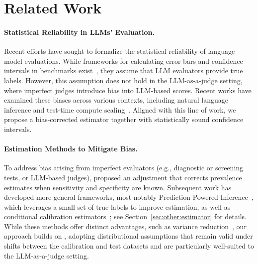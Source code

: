 \section{Related Work}
\label{sec:relatedwork}

\paragraph{Statistical Reliability in LLMs' Evaluation.}
Recent efforts have sought to formalize the statistical reliability of language model evaluations. While frameworks for calculating error bars and confidence intervals in benchmarks exist~\citep{miller2024adding}, they assume that LLM evaluators provide true labels. However, this assumption does not hold in the LLM-as-a-judge setting, where imperfect judges introduce bias into LLM-based scores. Recent works have examined these biases across various contexts, including natural language inference and test-time compute scaling~\citep{godbole-jia-2025-verify, mukherjee2025test, feng2025we}. Aligned with this line of work, we propose a bias-corrected estimator together with statistically sound confidence intervals.


\paragraph{Estimation Methods to Mitigate Bias.}
To address bias arising from imperfect evaluators (e.g., diagnostic or screening tests, or LLM-based judges), \citet{rogan1978estimating} proposed an adjustment that corrects prevalence estimates when sensitivity and specificity are known. Subsequent work has developed more general frameworks, most notably Prediction-Powered Inference~\citep{angelopoulos2023prediction, angelopoulos2023ppi++, zrnic2024cross, broska2025mixed, boyeau2025autoeval}, which leverages a small set of true labels to improve estimation, as well as conditional calibration estimators~\citep{buonaccorsi2010measurement, kloos2021comparing, meertens2022improving}; see Section~\ref{sec:other:estimator} for details. While these methods offer distinct advantages, such as variance reduction~\citep{kloos2021comparing, chen2026efficient}, our approach builds on \citet{rogan1978estimating, lang2014confidence}, adopting distributional assumptions that remain valid under shifts between the calibration and test datasets and are particularly well-suited to the LLM-as-a-judge setting.
